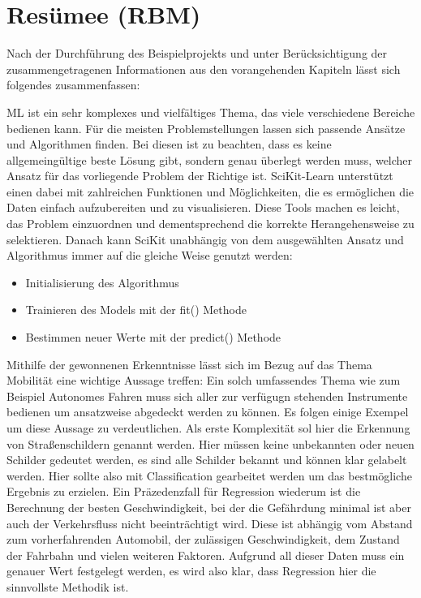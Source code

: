 \chapter{Resümee (RBM)}
\label{resümee}
Nach der Durchführung des Beispielprojekts und unter Berücksichtigung der zusammengetragenen Informationen aus den vorangehenden Kapiteln lässt sich folgendes zusammenfassen:

ML ist ein sehr komplexes und vielfältiges Thema, das viele verschiedene Bereiche bedienen kann. Für die meisten Problemstellungen lassen sich passende Ansätze und Algorithmen finden. Bei diesen ist zu beachten, dass es keine allgemeingültige beste Lösung gibt, sondern genau überlegt werden muss, welcher Ansatz für das vorliegende Problem der Richtige ist. 
SciKit-Learn unterstützt einen dabei mit zahlreichen Funktionen und Möglichkeiten, die es ermöglichen die Daten einfach aufzubereiten und zu visualisieren. Diese Tools machen es leicht, das Problem einzuordnen und dementsprechend die korrekte Herangehensweise zu selektieren.
Danach kann SciKit unabhängig von dem ausgewählten Ansatz und Algorithmus immer auf die gleiche Weise genutzt werden:
\begin{itemize}
	\item 
	Initialisierung des Algorithmus
	\item
	Trainieren des Models mit der fit() Methode
	\item
	Bestimmen neuer Werte mit der predict() Methode
\end{itemize}
Mithilfe der gewonnenen Erkenntnisse lässt sich im Bezug auf das Thema Mobilität eine wichtige Aussage treffen: 
Ein solch umfassendes Thema wie zum Beispiel Autonomes Fahren muss sich aller zur verfügugn stehenden Instrumente bedienen um ansatzweise abgedeckt werden zu können. Es folgen einige Exempel um diese Aussage zu verdeutlichen.
Als erste Komplexität sol hier die Erkennung von Straßenschildern genannt werden. Hier müssen keine unbekannten oder neuen Schilder gedeutet werden, es sind alle Schilder bekannt und können klar gelabelt werden. Hier sollte also mit Classification gearbeitet werden um das bestmögliche Ergebnis zu erzielen.
Ein Präzedenzfall für Regression wiederum ist die Berechnung der besten Geschwindigkeit, bei der die Gefährdung minimal ist aber auch der Verkehrsfluss nicht beeinträchtigt wird. Diese ist abhängig vom Abstand zum vorherfahrenden Automobil, der zulässigen Geschwindigkeit, dem Zustand der Fahrbahn und vielen weiteren Faktoren. Aufgrund all dieser Daten muss ein genauer Wert festgelegt werden, es wird also klar, dass Regression hier die sinnvollste Methodik ist. \cite{DAIM}
 
